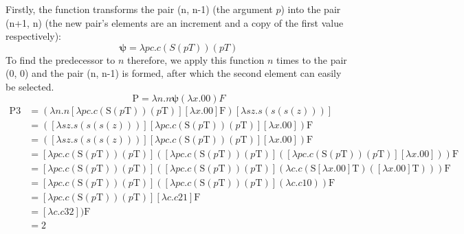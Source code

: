 \documentclass[Master.tex]{subfiles}
\begin{document}
Firstly, the function transforms the pair (n, n-1) (the argument $p$) into the pair (n+1, n) (the new pair's elements are an increment and a copy of the first value respectively):
\begin{equation*}
\bm{\psi} = \lambda pc.c(S(pT))(pT)
\end{equation*}
To find the predecessor to $n$ therefore, we apply this function $n$ times to the pair (0, 0) and the pair (n, n-1) is formed, after which the second element can easily be selected.
\begin{equation*}
\bm{\mathrm{P}} = \lambda n.n \bm{\psi} (\lambda x.00) F 
\end{equation*}
\begin{equation*}
\begin{aligned}
\bm{\mathrm{P3}} &= (\lambda n.n [\lambda pc.c(\bm{\mathrm{S}}(p\bm{\mathrm{T}}))(p\bm{\mathrm{T}})] [\lambda x.\bm{\mathrm{00}}] \bm{\mathrm{F}}) [\lambda sz.s(s(s(z)))]\\
&= ([\lambda sz.s(s(s(z)))] [\lambda pc.c(\bm{\mathrm{S}}(p\bm{\mathrm{T}}))(p\bm{\mathrm{T}})] [\lambda x.\bm{\mathrm{00}}]) \bm{\mathrm{F}}\\
&= ([\lambda sz.s(s(s(z)))] [\lambda pc.c(\bm{\mathrm{S}}(p\bm{\mathrm{T}}))(p\bm{\mathrm{T}})] [\lambda x.\bm{\mathrm{00}}]) \bm{\mathrm{F}}\\
&= [\lambda pc.c(\bm{\mathrm{S}}(p\bm{\mathrm{T}}))(p\bm{\mathrm{T}})]([\lambda pc.c(\bm{\mathrm{S}}(p\bm{\mathrm{T}}))(p\bm{\mathrm{T}})]([\lambda pc.c(\bm{\mathrm{S}}(p\bm{\mathrm{T}}))(p\bm{\mathrm{T}})][\lambda x.\bm{\mathrm{00}}]))\bm{\mathrm{F}}\\
&= [\lambda pc.c(\bm{\mathrm{S}}(p\bm{\mathrm{T}}))(p\bm{\mathrm{T}})]([\lambda pc.c(\bm{\mathrm{S}}(p\bm{\mathrm{T}}))(p\bm{\mathrm{T}})](\lambda c.c(\bm{\mathrm{S}}[\lambda x.\bm{\mathrm{00}}]\bm{\mathrm{T}})([\lambda x.\bm{\mathrm{00}}]\bm{\mathrm{T}})))\bm{\mathrm{F}}\\
&= [\lambda pc.c(\bm{\mathrm{S}}(p\bm{\mathrm{T}}))(p\bm{\mathrm{T}})]([\lambda pc.c(\bm{\mathrm{S}}(p\bm{\mathrm{T}}))(p\bm{\mathrm{T}})](\lambda c.c\bm{\mathrm{10}}))\bm{\mathrm{F}}\\
&= [\lambda pc.c(\bm{\mathrm{S}}(p\bm{\mathrm{T}}))(p\bm{\mathrm{T}})][\lambda c.c\bm{\mathrm{21}}]\bm{\mathrm{F}}\\
&= [\lambda c.c\bm{\mathrm{32}} ])\bm{\mathrm{F}}\\
&= \bm{\mathrm{2}}
\end{aligned}
\end{equation*}
\end{document}
